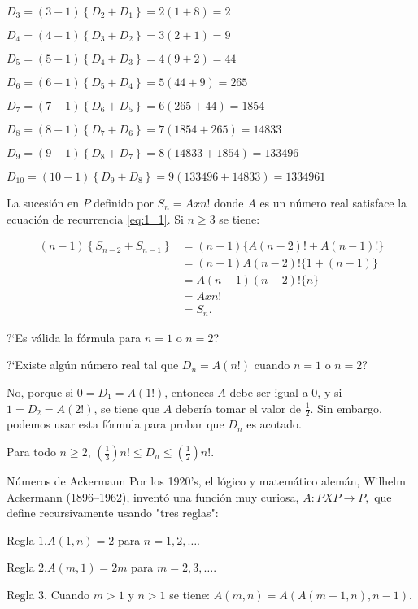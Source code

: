 \begin{example}{}
$D_{3}=\left(3-1\right)\left\{D_{2}+D_{1}\right\}=2\left(1+8\right)=2$

$D_{4}=\left(4 - 1\right)\left\{D_{3}+D_{2}\right\}=3\left(2+1\right)=9$

$D_{5}=\left(5-1\right)\left\{D_{4}+D_{3}\right\}=4\left(9+2\right)=44$

$D_{6}=(6-1)\left\{D_{5}+D_{4}\right\}=5\left(44 + 9\right)=265$

$D_{7}=\left(7-1\right)\left\{D_{6}+D_{5}\right\}=6\left(265+44\right)=1854$

$D_{8}=\left(8-1\right)\left\{D_{7}+D_{6}\right\}=7\left(1854+265\right)=14833$

$D_{9}=\left(9-1\right)\left\{D_{8}+D_{7}\right\}=8\left(14833+1854\right)=133496$

$D_{10}=\left(10-1\right)\left\{D_{9}+D_{8}\right\}=9\left(133496+14833\right)=1334961$

La sucesión en $P$ definido por $S_{n} = Axn!$ donde $A$ es un número real satisface la ecuación de recurrencia \eqref{eq:1_1}. Si $n\geq3$ se tiene:

\begin{align*}
	\left(n-1\right)\left\{S_{n-2}+S_{n-1}\right\}
	&=(n-1)\{A(n-2)! + A(n-1)!\} \\
	&= (n-1)A(n-2)!\{1+(n-1)\} \\
	&= A(n-1)(n-2)!\{n\}\\
	&= A x n!\\
	&= S_{n}.
\end{align*}

?`Es válida la fórmula para $n=1$ o $n=2$?

?`Existe algún número real tal que $D_{n}=A(n!)$ cuando $n=1$ o $n=2$?

No, porque si $0=D_{1}=A(1!)$, entonces $A$ debe ser igual a $0$, y si $1=D_{2}=A(2!)$, se tiene que $A$ debería tomar el valor de $\frac{1}{2}$. Sin embargo, podemos usar esta fórmula para probar que $D_{n}$ es acotado.
\end{example}

\begin{theorem}{}
Para todo $n\geq 2$, $\left(\frac{1}{3}\right)n!\leq D_{n}\leq\left(\frac{1}{2}\right)n!$.
\end{theorem}

\begin{example}{Números de Ackermann}
	Por los 1920's, el lógico y matemático alemán, Wilhelm Ackermann (1896–1962), inventó una función muy curiosa, $A\colon PXP\longrightarrow P,$ que define recursivamente usando "tres reglas":
	
	Regla $1$.$A(1,n)=2$ para $n=1,2,\ldots$.
	
	Regla $2$.$A(m,1)=2m$ para $m=2,3,\ldots$.
	
	Regla $3$. Cuando $m>1$ y $n>1$ se tiene: $A(m,n)=A(A(m-1,n),n-1)$.
\end{example}

